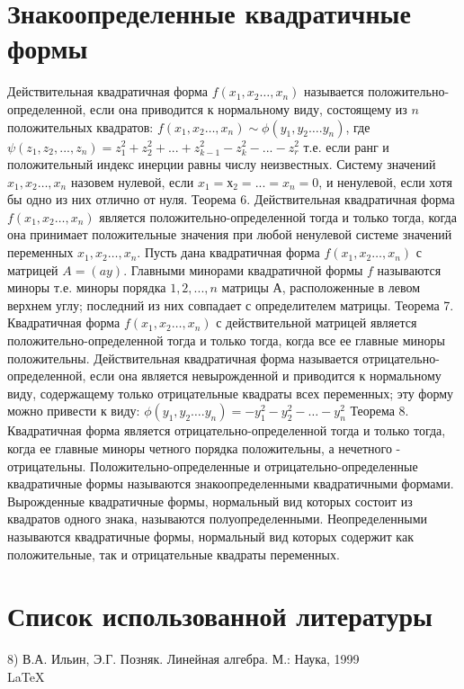 \documentclass[a4paper,14pt]{report}
\newcommand\tab[1][1cm]{\hspace*{#1}}
\newcommand{\tl}{\newline\tab}
\begin{document}
\section{Знакоопределенные квадратичные формы}
\tab Действительная квадратичная форма $f(x_1,x_2…,x_n)$ называется положительно-определенной, если она приводится к нормальному виду, состоящему из $n$ положительных квадратов: $f(x_1,x_2…,x_n) \sim \phi(y_1,y_2….y_n)$, где \newline
$\psi(z_1,z_2,...,z_n)=z_1^2+z_2^2+...+z_{k-1}^2-z_k^2-...-z_r^2$ т.е. если ранг и положительный индекс инерции равны числу неизвестных.
\tl
Систему значений $x_1,x_2…,x_n$ назовем нулевой, если $x_1 = х_2 = ... = x_n = 0$, и ненулевой, если хотя бы одно из них отлично от нуля.
\tl
Теорема 6. Действительная квадратичная форма $f(x_1,x_2…,x_n)$ является положительно-определенной тогда и только тогда, когда она принимает положительные значения при любой ненулевой системе значений переменных $x_1,x_2…,x_n$. Пусть дана квадратичная форма $f(x_1,x_2…,x_n)$ с матрицей $A = (ay)$. Главными минорами квадратичной формы $f$ называются миноры  
\tl
т.е. миноры порядка $1, 2, ... , n$ матрицы $А$, расположенные в левом верхнем углу; последний из них совпадает с определителем матрицы.
\tl
Теорема 7. Квадратичная форма $f(x_1,x_2…,x_n)$ с действительной матрицей является положительно-определенной тогда и только тогда, когда все ее главные миноры положительны.
\tl
Действительная квадратичная форма называется отрицательно-определенной, если она является невырожденной и приводится к нормальному виду, содержащему только отрицательные квадраты всех переменных; эту форму можно привести к виду:
$\phi(y_1,y_2….y_n)= -y_{1}^2-y_{2}^2 -…- y_{n}^2$
\tl
Теорема 8. Квадратичная форма является отрицательно-определенной тогда и только тогда, когда ее главные миноры четного порядка положительны, а нечетного - отрицательны.
\tl
Положительно-определенные и отрицательно-определенные квадратичные формы называются знакоопределенными квадратичными формами.
\tl
Вырожденные квадратичные формы, нормальный вид которых состоит из квадратов одного знака, называются полуопределенными. Неопределенными называются квадратичные формы, нормальный вид которых содержит как положительные, так и отрицательные квадраты переменных.

\section{Список использованной литературы}

8) В.А. Ильин, Э.Г. Позняк. Линейная алгебра. М.: Наука, 1999
\\\LaTeX
\end{document}
